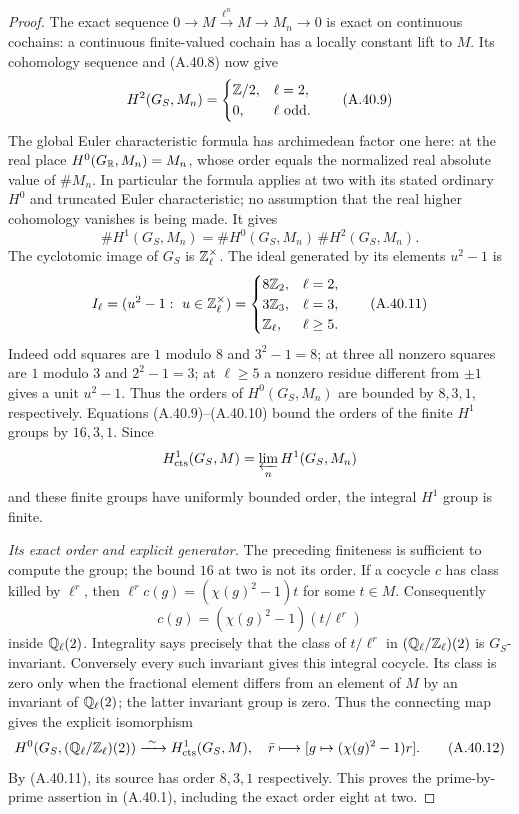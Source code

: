 \begin{proof}
The exact sequence $0\to M\xrightarrow{\ell^n}M\to M_n\to0$
is exact on continuous cochains: a continuous finite-valued
cochain has a locally constant lift to $M$.  Its cohomology
sequence and (A.40.8) now give
\[
 H^2(G_S,M_n)=
 \begin{cases}\mathbb Z/2,&\ell=2,\\0,&\ell\text{ odd}.\end{cases}
 \tag{A.40.9}
\]
The global Euler characteristic formula
\cite[I, Theorem 5.1]{BIR_MilneADT} has archimedean factor one
here: at the real place $H^0(G_\mathbb R,M_n)=M_n$, whose order equals
the normalized real absolute value of $\#M_n$.  In particular
the formula applies at two with its stated ordinary $H^0$ and
truncated Euler characteristic; no assumption that the real
higher cohomology vanishes is being made.  It gives
\[
          \#H^1(G_S,M_n)=\#H^0(G_S,M_n)\,\#H^2(G_S,M_n).
 \tag{A.40.10}
\]
The cyclotomic image of $G_S$ is $\mathbb Z_\ell^\times$.  The ideal
generated by its elements $u^2-1$ is
\[
 I_\ell=(u^2-1:\ u\in\mathbb Z_\ell^\times)=
 \begin{cases}
  8\mathbb Z_2,&\ell=2,\\
  3\mathbb Z_3,&\ell=3,\\
  \mathbb Z_\ell,&\ell\ge5.
 \end{cases}
 \tag{A.40.11}
\]
Indeed odd squares are $1$ modulo $8$ and $3^2-1=8$;
at three all nonzero squares are $1$ modulo $3$ and $2^2-1=3$;
at $\ell\ge5$ a nonzero residue different from $\pm1$ gives a
unit $u^2-1$.  Thus the orders of $H^0(G_S,M_n)$ are bounded by
$8,3,1$, respectively.  Equations (A.40.9)--(A.40.10) bound the
orders of the finite $H^1$ groups by $16,3,1$.  Since
\[
 H^1_{\rm cts}(G_S,M)=\varprojlim_nH^1(G_S,M_n)
\]
and these finite groups have uniformly bounded order, the
integral $H^1$ group is finite.

\emph{Its exact order and explicit generator.}
The preceding finiteness is sufficient to compute the group;
the bound $16$ at two is not its order.  If a cocycle $c$ has
class killed by $\ell^r$, then $\ell^r c(g)=(\chi(g)^2-1)t$
for some $t\in M$.  Consequently
\[
                   c(g)=(\chi(g)^2-1)(t/\ell^r)
\]
inside $\mathbb Q_\ell(2)$.  Integrality says precisely that the class
of $t/\ell^r$ in $(\mathbb Q_\ell/\mathbb Z_\ell)(2)$ is $G_S$-invariant.
Conversely every such invariant gives this integral cocycle.
Its class is zero only when the fractional element differs from
an element of $M$ by an invariant of $\mathbb Q_\ell(2)$; the latter
invariant group is zero.  Thus the connecting map gives the
explicit isomorphism
\[
 H^0(G_S,(\mathbb Q_\ell/\mathbb Z_\ell)(2))
    \xrightarrow{\ \sim\ }H^1_{\rm cts}(G_S,M),
 \quad \bar r\longmapsto[g\mapsto(\chi(g)^2-1)r].
 \tag{A.40.12}
\]
By (A.40.11), its source has order $8,3,1$ respectively.
This proves the prime-by-prime assertion in (A.40.1), including
the exact order eight at two.


\end{proof}
